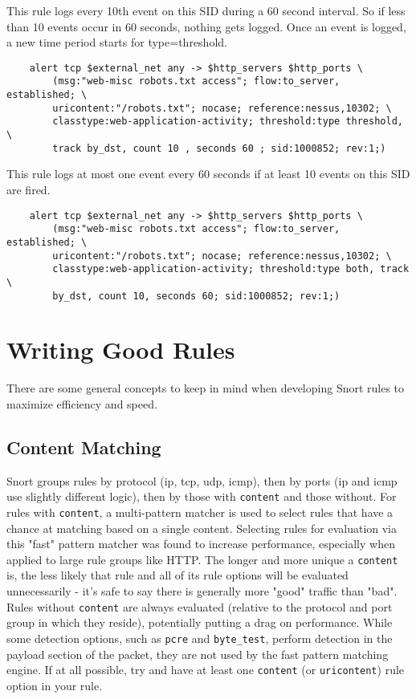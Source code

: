 \documentclass[english]{report}
\begin{document}
This rule logs every 10th event on this SID during a 60 second interval. So if
less than 10 events occur in 60 seconds, nothing gets logged.  Once an event is
logged, a new time period starts for type=threshold.

\begin{verbatim}
    alert tcp $external_net any -> $http_servers $http_ports \
        (msg:"web-misc robots.txt access"; flow:to_server, established; \
        uricontent:"/robots.txt"; nocase; reference:nessus,10302; \
        classtype:web-application-activity; threshold:type threshold, \
        track by_dst, count 10 , seconds 60 ; sid:1000852; rev:1;)
\end{verbatim}

This rule logs at most one event every 60 seconds if at least 10 events on this
SID are fired.

\begin{verbatim}
    alert tcp $external_net any -> $http_servers $http_ports \
        (msg:"web-misc robots.txt access"; flow:to_server, established; \
        uricontent:"/robots.txt"; nocase; reference:nessus,10302; \
        classtype:web-application-activity; threshold:type both, track \
        by_dst, count 10, seconds 60; sid:1000852; rev:1;)
\end{verbatim}

\section{Writing Good Rules}

There are some general concepts to keep in mind when developing Snort rules to
maximize efficiency and speed.

\subsection{Content Matching}

Snort groups rules by protocol (ip, tcp, udp, icmp), then by ports
(ip and icmp use slightly different logic), then by those with \texttt{content}
and those without.  For rules with \texttt{content}, a multi-pattern matcher is
used to select rules that have a chance at matching based on a single content.
Selecting rules for evaluation via this "fast" pattern matcher was found to
increase performance, especially when applied to large rule groups like HTTP.
The longer and more unique a \texttt{content} is, the less likely that rule and
all of its rule options will be evaluated unnecessarily - it's safe to say
there is generally more "good" traffic than "bad".  Rules without
\texttt{content} are always evaluated (relative to the protocol and port group
in which they reside), potentially putting a drag on performance.
While some detection options, such as \texttt{pcre} and \texttt{byte\_test},
perform detection in the payload section of the packet, they are not used by the
fast pattern matching engine.  If at all possible, try and have at least one
\texttt{content} (or \texttt{uricontent}) rule option in your rule.
\end{document}
